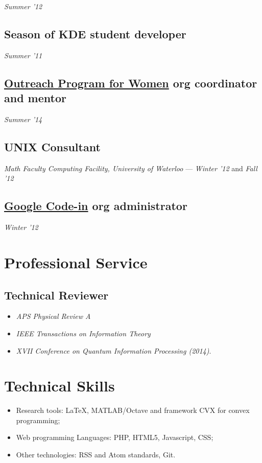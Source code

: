 \documentclass[]{article}
\begin{document}
\emph{Summer '12}

\subsection{Season of KDE student
developer}\label{season-of-kde-student-developer}

\emph{Summer '11}

\subsection{\href{https://gnome.org/opw/}{Outreach Program for Women}
org coordinator and
mentor}\label{outreach-program-for-womenopw-org-coordinator-and-mentor}

\emph{Summer '14}

\subsection{UNIX Consultant}\label{unix-consultant}

\emph{Math Faculty Computing Facility, University of Waterloo} ---
\emph{Winter '12} and \emph{Fall '12}

\subsection{\href{https://www.google-melange.com/gci/homepage/google/gci2012}{Google
Code-in} org
administrator}\label{google-code-incodein-org-administrator}

\emph{Winter '12}


\section{Professional Service}\label{professional-service}

\subsection{Technical Reviewer} 
\begin{itemize}
  \item \emph{APS Physical Review A}
  \item \emph{IEEE Transactions on Information Theory}
  \item \emph{XVII Conference on Quantum Information Processing (2014)}.
\end{itemize}

\section{Technical Skills}\label{technical-skills}

\begin{itemize}
\itemsep1pt\parskip0pt
\item
  Research tools: LaTeX, MATLAB/Octave and framework CVX for convex
  programming;
\item
  Web programming Languages: PHP, HTML5, Javascript, CSS;
\item
  Other technologies: RSS and Atom standards, Git.
\end{itemize}
\end{document}
